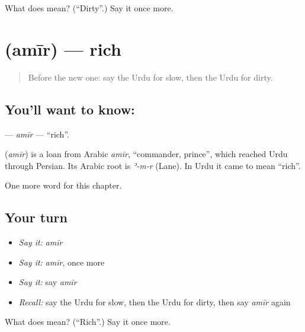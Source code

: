 \begin{tcolorbox}[breakable,colback=teal!4,colframe=teal!35!black,title={Before you move on}]
What does  mean? (\textquotedblleft{}Dirty\textquotedblright{}.) Say it once more.
\end{tcolorbox}
\section[\texorpdfstring{\ur{امیر} (amīr)}{امیر (amīr)}]{ (amīr) — rich}

\label{lesson:UR-C132-amir}



\begin{quote}
Before the new one: say the Urdu for slow, then the Urdu for dirty.
\end{quote}

\subsection*{You'll want to know: }
\textbf{} — \emph{amīr} — \textquotedblleft{}rich\textquotedblright{}.

\begin{cousinweb}
\textbf{} (\emph{amīr}) is a loan from Arabic \emph{amīr}, \textquotedblleft{}commander, prince\textquotedblright{}, which reached Urdu through Persian. Its Arabic root is \emph{ʾ-m-r} (Lane). In Urdu it came to mean \textquotedblleft{}rich\textquotedblright{}.
\end{cousinweb}

\begin{grammarlens}[title={What you've built}]
One more word for this chapter.
\end{grammarlens}

\subsection*{Your turn}
\begin{itemize}
\raggedright
  \item \emph{Say it:} \emph{amīr}
  \item \emph{Say it:} \emph{amīr}, once more
  \item \emph{Say it:} say \emph{amīr}
  \item \emph{Recall:} say the Urdu for slow, then the Urdu for dirty, then say \emph{amīr} again
\end{itemize}

\begin{tcolorbox}[breakable,colback=teal!4,colframe=teal!35!black,title={Before you move on}]
What does  mean? (\textquotedblleft{}Rich\textquotedblright{}.) Say it once more.
\end{tcolorbox}
